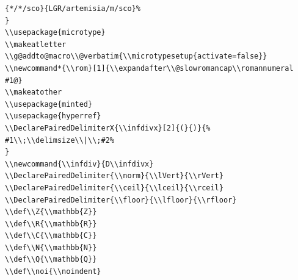 \documentclass[10pt]{article}
\makeatletter
\newcommand*{\rom}[1]{\expandafter\@slowromancap\romannumeral #1@}
\newcommand{\infdiv}{D\infdivx}
\DeclarePairedDelimiter{\norm}{\lVert}{\rVert}
\DeclarePairedDelimiter{\ceil}{\lceil}{\rceil}
\DeclarePairedDelimiter{\floor}{\lfloor}{\rfloor}
\def\Z{\mathbb{Z}}
\def\R{\mathbb{R}}
\def\C{\mathbb{C}}
\def\N{\mathbb{N}}
\def\Q{\mathbb{Q}}
\def\noi{\noindent}
\makeatother
\begin{document}
\begin{verbatim}
{*/*/sco}{LGR/artemisia/m/sco}%
}
\\usepackage{microtype}
\\makeatletter
\\g@addto@macro\\@verbatim{\\microtypesetup{activate=false}}
\\newcommand*{\\rom}[1]{\\expandafter\\@slowromancap\\romannumeral #1@}
\\makeatother
\\usepackage{minted}
\\usepackage{hyperref}
\\DeclarePairedDelimiterX{\\infdivx}[2]{(}{)}{%
#1\\;\\delimsize\\|\\;#2%
}
\\newcommand{\\infdiv}{D\\infdivx}
\\DeclarePairedDelimiter{\\norm}{\\lVert}{\\rVert}
\\DeclarePairedDelimiter{\\ceil}{\\lceil}{\\rceil}
\\DeclarePairedDelimiter{\\floor}{\\lfloor}{\\rfloor}
\\def\\Z{\\mathbb{Z}}
\\def\\R{\\mathbb{R}}
\\def\\C{\\mathbb{C}}
\\def\\N{\\mathbb{N}}
\\def\\Q{\\mathbb{Q}}
\\def\\noi{\\noindent}


\end{verbatim}
\end{document}
